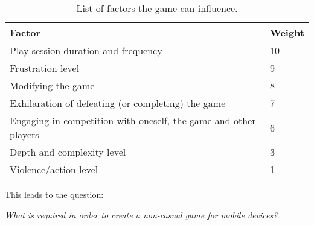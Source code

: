 \begin{table}[h]
\begin{tabular}{|l|l|}
\hline
\rowcolor[HTML]{C0C0C0}
Factor                                                                & Weight \\ \hline
Play session duration and frequency									  & 10     \\ \hline
Frustration level			                                          & 9      \\ \hline
Modifying the game 									                  & 8      \\ \hline
Exhilaration of defeating (or completing) the game 				      & 7      \\ \hline
Engaging in competition with oneself, the game and other players 	  & 6      \\ \hline
Depth and complexity level					                          & 3      \\ \hline
Violence/action level 		                                          & 1      \\ \hline
\end{tabular}
\label{tab:relevantFactors}
\caption{List of factors the game can influence.}
\end{table}



This leads to the question:
\begin{center}\label{intro:problem_statement}
\textit{What is required in order to create a non-casual game for mobile devices?}
\end{center}
